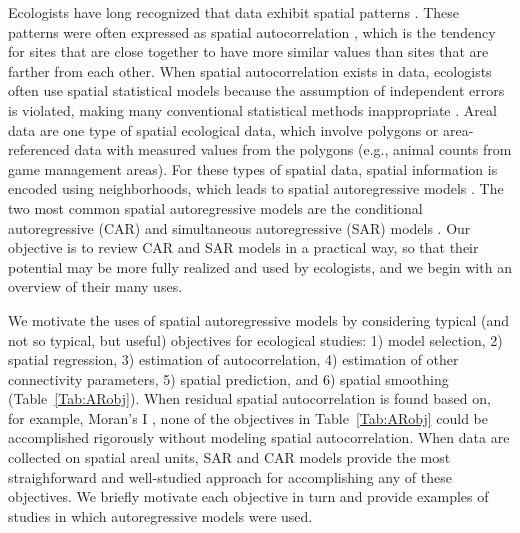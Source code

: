 

Ecologists have long recognized that data exhibit spatial patterns \citep{Watt:patt:1947}. These patterns were often expressed as spatial autocorrelation \citep{Soka:Oden:spat:1978}, which is the tendency for sites that are close together to have more similar values than sites that are farther from each other.  When spatial autocorrelation exists in data, ecologists often use spatial statistical models because the assumption of independent errors is violated, making many conventional statistical methods inappropriate \citep{Clif:Ord:spat:1981,Lege:spat:1993}.   Areal data are one type of spatial ecological data, which involve polygons or area-referenced data with measured values from the polygons (e.g., animal counts from game management areas). For these types of spatial data, spatial information is encoded using neighborhoods, which leads to spatial autoregressive models \citep{Lich:Simo:Shri:Fran:spat:2002}. The two most common spatial autoregressive models are the conditional autoregressive (CAR) and simultaneous autoregressive (SAR) models \citep{Hain:spat:1990,Cres:stat:1993}. Our objective is to review CAR and SAR models in a practical way, so that their potential may be more fully realized and used by ecologists, and we begin with an overview of their many uses.

We motivate the uses of spatial autoregressive models by considering typical (and not so typical, but useful) objectives for ecological studies: 1) model selection, 2) spatial regression, 3) estimation of autocorrelation, 4) estimation of other connectivity parameters, 5) spatial prediction, and 6) spatial smoothing (Table~\ref{Tab:ARobj}).  When residual spatial autocorrelation is found based on, for example, Moran's I \citep{Mora:inte:1948,Soka:Oden:spat:1978}, none of the objectives in Table~\ref{Tab:ARobj} could be accomplished rigorously without modeling spatial autocorrelation.  When data are collected on spatial areal \citep[also called lattice,][]{Cres:stat:1993} units, SAR and CAR models provide the most straighforward and well-studied approach for accomplishing any of these objectives.  We briefly motivate each objective in turn and provide examples of studies in which autoregressive models were used.

